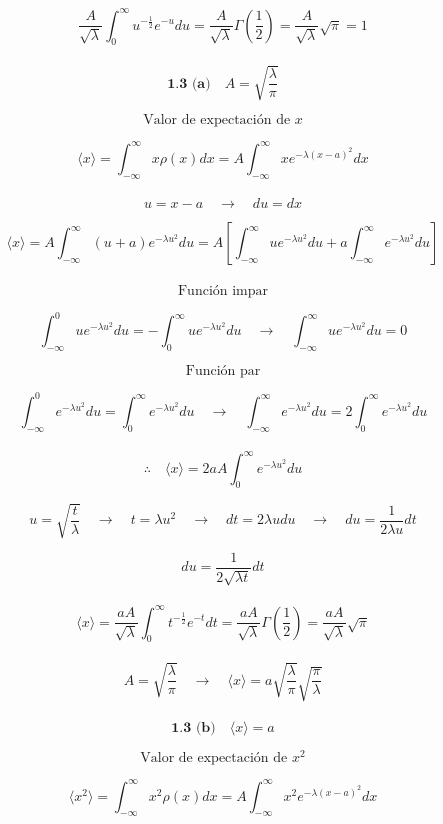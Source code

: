 \documentclass[10pt,a4papper]{article}
\begin{document}
\[\frac{A}{\sqrt{\lambda}}\int_0^\infty u^{-\frac{1}{2}}e^{-u}du=
\frac{A}{\sqrt{\lambda}}\Gamma\left(\frac{1}{2}\right)=
\frac{A}{\sqrt{\lambda}}\sqrt{\pi}=1\]\\

\[\boxed{\textbf{1.3 (a)}\quad A=\sqrt{\frac{\lambda}{\pi}}}\]

\newpage
\[\text{Valor de expectación de }x\]

\[\langle x\rangle=
\int_{-\infty}^\infty x\rho(x)dx=
A\int_{-\infty}^\infty xe^{-\lambda(x-a)^2}dx\]\\

\[u=x-a\quad\to\quad du=dx\]

\[\langle x\rangle=
A\int_{-\infty}^\infty (u+a)e^{-\lambda u^2}du=
A\left[\int_{-\infty}^\infty ue^{-\lambda u^2}du+a\int_{-\infty}^\infty e^{-\lambda u^2}du\right]\]\\

\[\text{Función impar}\]

\[\int_{-\infty}^0 ue^{-\lambda u^2}du=-\int_0^\infty ue^{-\lambda u^2}du\quad\to\quad
\int_{-\infty}^\infty ue^{-\lambda u^2}du=0\]

\[\text{Función par}\]

\[\int_{-\infty}^0 e^{-\lambda u^2}du=\int_0^\infty e^{-\lambda u^2}du\quad\to\quad
\int_{-\infty}^\infty e^{-\lambda u^2}du=2\int_0^\infty e^{-\lambda u^2}du\]\\

\[\therefore\quad\langle x\rangle=2aA\int_0^\infty e^{-\lambda u^2}du\]

\newpage
\[u=\sqrt{\frac{t}{\lambda}}\quad\to\quad t=\lambda u^2\quad\to\quad dt=2\lambda udu\quad\to\quad du=\frac{1}{2\lambda u}dt\]

\[du=\frac{1}{2\sqrt{\lambda t}}dt\]\\

\[\langle x\rangle=
\frac{aA}{\sqrt{\lambda}}\int_0^\infty t^{-\frac{1}{2}}e^{-t}dt=
\frac{aA}{\sqrt{\lambda}}\Gamma\left(\frac{1}{2}\right)=
\frac{aA}{\sqrt{\lambda}}\sqrt{\pi}\]\\

\[A=\sqrt{\frac{\lambda}{\pi}}\quad\to\quad\langle x\rangle=a\sqrt{\frac{\lambda}{\pi}}\sqrt{\frac{\pi}{\lambda}}\]\\

\[\boxed{\textbf{1.3 (b)}\quad\langle x\rangle=a}\]

\newpage
\[\text{Valor de expectación de }x^2\]

\[\langle x^2\rangle=
\int_{-\infty}^\infty x^2\rho(x)dx=
A\int_{-\infty}^\infty x^2e^{-\lambda(x-a)^2}dx\]\\
\end{document}
